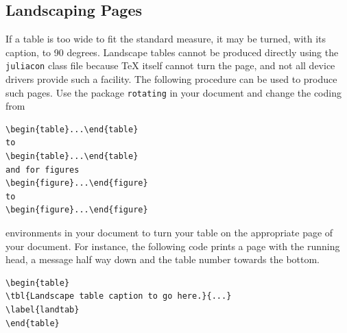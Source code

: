 \documentclass{juliacon}
\begin{document}
\begin{table}
\end{table}
\subsection{Landscaping Pages}
\label{subsub:landscaping_pages}
If a table is too wide to fit the standard measure, it may be turned,
with its caption, to 90 degrees. Landscape tables cannot be produced
directly using the \verb|juliacon|   class file because \TeX{} itself cannot
turn the page, and not all device drivers provide such a facility.
The following procedure can be used to produce such pages.
\vskip 6pt
Use the package \verb|rotating|   in your document and change the coding
from
\begin{verbatim}
\begin{table}...\end{table}
to
\begin{table}...\end{table}
and for figures
\begin{figure}...\end{figure}
to
\begin{figure}...\end{figure}
\end{verbatim}

environments in your document to turn your table on the appropriate
page of your document. For instance, the following code prints
a page with the running head, a message half way down and the
table number towards the bottom.
\begin{verbatim}
\begin{table}
\tbl{Landscape table caption to go here.}{...}
\label{landtab}
\end{table}
\end{verbatim}
\end{document}
